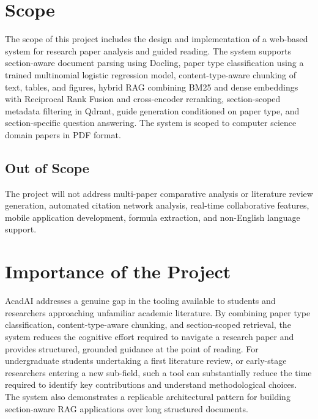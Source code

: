\documentclass[12pt,a4paper]{report}
\begin{document}
\section{Scope}

The scope of this project includes the design and implementation of a web-based
system for research paper analysis and guided reading. The system supports
section-aware document parsing using Docling, paper type classification using a
trained multinomial logistic regression model, content-type-aware chunking of
text, tables, and figures, hybrid RAG combining BM25 and dense embeddings with
Reciprocal Rank Fusion and cross-encoder reranking, section-scoped metadata
filtering in Qdrant, guide generation conditioned on paper type, and
section-specific question answering. The system is scoped to computer science
domain papers in PDF format.

\subsection*{Out of Scope}
The project will not address multi-paper comparative analysis or literature
review generation, automated citation network analysis, real-time collaborative
features, mobile application development, formula extraction, and non-English
language support.

\section{Importance of the Project}

AcadAI addresses a genuine gap in the tooling available to students and
researchers approaching unfamiliar academic literature. By combining paper type
classification, content-type-aware chunking, and section-scoped retrieval, the
system reduces the cognitive effort required to navigate a research paper and
provides structured, grounded guidance at the point of reading. For
undergraduate students undertaking a first literature review, or early-stage
researchers entering a new sub-field, such a tool can substantially reduce the
time required to identify key contributions and understand methodological
choices. The system also demonstrates a replicable architectural pattern for
building section-aware RAG applications over long structured documents.
\end{document}

